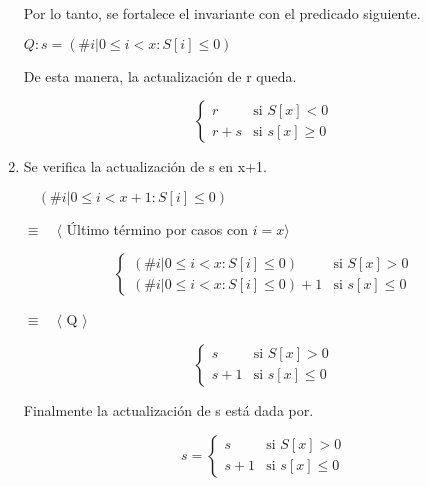 \documentclass[hidelinks]{article}
\begin{document}
\begin{enumerate}
	      Por lo tanto, se fortalece el invariante con el predicado siguiente. \par

	      \begin{center}
		      $Q: s = (\# i| 0\leq i < x :S[i] \leq 0)$ \par
	      \end{center}

	      De esta manera, la actualización de r queda.

	      \begin{equation}
		      \begin{cases}
			      r     & \text{si } S[x] < 0    \\
			      r + s & \text{si } s[x] \geq 0
		      \end{cases}
	      \end{equation} \par

	\item Se verifica la actualización de s en x+1. \par
	      $\quad (\# i| 0\leq i < x+1 :S[i] \leq 0)$ \par
	      $\equiv \quad \langle$ Último término por casos con $ i = x \rangle$ \par
	      \begin{equation}
		      \begin{cases}
			      (\# i| 0\leq i < x :S[i] \leq 0)     & \text{si } S[x] > 0    \\
			      (\# i| 0\leq i < x :S[i] \leq 0) + 1 & \text{si } s[x] \leq 0
		      \end{cases}
	      \end{equation} \par
	      $\equiv \quad \langle$ Q $ \rangle$ \par
	      \begin{equation}
		      \begin{cases}
			      s     & \text{si } S[x] > 0    \\
			      s + 1 & \text{si } s[x] \leq 0
		      \end{cases}
	      \end{equation} \par

	      Finalmente la actualización de s está dada por. \par
	      \begin{equation}
		      s =
		      \begin{cases}
			      s     & \text{si } S[x] > 0    \\
			      s + 1 & \text{si } s[x] \leq 0
		      \end{cases}
	      \end{equation} \par

\end{enumerate}
\end{document}
